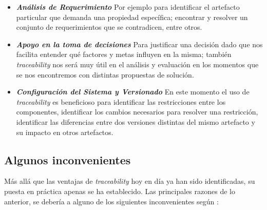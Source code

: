 \documentclass[a4paper,12pt,oneside,spanish]{book}
\begin{document}
\begin{itemize}
\item \textit{\textbf{Análisis de Requerimiento}} Por ejemplo para identificar el artefacto particular que demanda una propiedad específica; encontrar y resolver un conjunto de requerimientos que se contradicen, entre otros.

\item \textit{\textbf{Apoyo en la toma de decisiones}} Para justificar una decisión dado que nos facilita entender qué factores y metas influyen en la misma; también \textit{traceability} nos será muy útil en el análisis y evaluación en los momentos que se nos encontremos con distintas propuestas de solución.

\item \textit{\textbf{Configuración del Sistema y Versionado}} En este momento el uso de \textit{traceability} es beneficioso para identificar las restricciones entre los componentes, identificar los cambios necesarios para resolver una restricción, identificar las diferencias entre dos versiones distintas del mismo artefacto y su impacto en otros artefactos.

\end{itemize}


\subsection{Algunos inconvenientes}

Más allá que las ventajas de \textit{traceability} hoy en día ya han sido identificadas, su puesta en práctica apenas se ha establecido. Las principales razones de lo anterior, se debería a alguno de los siguientes inconvenientes según \cite{GrammelVoigt}:
\end{document}
